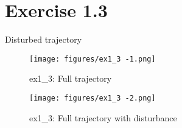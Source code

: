 \section*{Exercise 1.3}
Disturbed trajectory

\begin{figure*}[htbp]
    \centering
    \texttt{[image: figures/ex1\_3 -1.png]}
    \caption{ex1\_3: Full trajectory}
\end{figure*}

\begin{figure*}[htbp]
    \centering
    \texttt{[image: figures/ex1\_3 -2.png]}
    \caption{ex1\_3: Full trajectory with disturbance}
\end{figure*}
